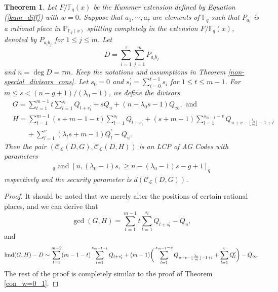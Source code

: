 \documentclass[journal,12pt,onecolumn]{IEEEtran}
\newtheorem{theorem}{Theorem}
\begin{document}
\begin{theorem}\label{con_w=0_2}
    Let $F/\mathbb{F}_q(x)$ be the Kummer extension defined by Equation (\ref{kum_diff}) with $w=0$. Suppose that $a_1,\cdots,a_\tau$ are elements of $\mathbb{F}_q$ such that $P_{a_i}$ is a rational place in $\mathbb{P}_{\mathbb{F}_q(x)}$ splitting completely in the extension $F/\mathbb{F}_q(x)$, denoted by $P_{a_ib_j}$ for $1\le j \le m$. Let
    \[
        D = \sum_{i=1}^\tau \sum_{j=1}^m P_{a_ib_j}
    \]
    and $n=\deg D=\tau m$. Keep the notations and assumptions in Theorem \ref{non-special_divisors_cons}. Let $s_0=0$ and $s_t^\prime=\sum_{i=0}^{t-1}s_i$ for $1\le t\le m-1$. For $m\le s <(n-g+1)/(\lambda_0-1)$, we define the divisors
    \begin{align*}
        & G = \sum_{t=1}^{m-1}t\sum_{l=1}^{s_t}Q_{l+s_t^\prime} + sQ_u +  (n-\lambda_0s-1)Q_\infty,\text{ and }\\
        & H = \sum_{t=1}^{m-1}(s+m-1-t)\sum_{l=1}^{s_t}Q_{l+s_t^\prime} + (s+m-1)\sum_{l=1}^{s_{m-1}-v}Q_{u+v-\lfloor\frac{\lambda_0}{m}\rfloor-1+l}\\
        &\qquad + \sum_{l=1}^{v}(\lambda_l s+m-1)Q^\prime_l -Q_u. 
    \end{align*}
    Then the pair $(\mathcal{C}_{\mathcal{L}}(D,G),\mathcal{C}_{\mathcal{L}}(D,H))$ is an LCP of AG Codes with parameters
    \begin{gather*}
            [n,n-(\lambda_0-1)s,\ge (\lambda_0-1)s-g+1]_q\text{ and }[n,(\lambda_0-1)s,\ge n-(\lambda_0-1)s-g+1]_q
    \end{gather*}
    respectively and the security parameter is $d(\mathcal{C}_{\mathcal{L}}(D,G))$. 
\end{theorem}
\begin{proof}
    It should be noted that we merely alter the positions of certain rational places, and we can derive that 
    \[
        \gcd (G,H) = \sum_{t=1}^{m-1}t\sum_{l=1}^{s_t}Q_{l+s_t^\prime} - Q_u,
    \]
    and 
    \[
        {\rm lmd}(G,H)-D \sim \sum_{t=1}^{m-2}(m-1-t)\sum_{l=1}^{s_{m-1-t}}Q_{l+s_t^\prime} + (m-1)\bigg(\sum_{l=1}^{s_{m-1}-v}Q_{u+v-\lfloor\frac{\lambda_0}{m}\rfloor-1+l}+\sum_{l=1}^{v}Q^\prime_l\bigg) -Q_\infty.
    \]
    The rest of the proof is completely similar to the proof of Theorem \ref{con_w=0_1}. 
\end{proof}
\end{document}
